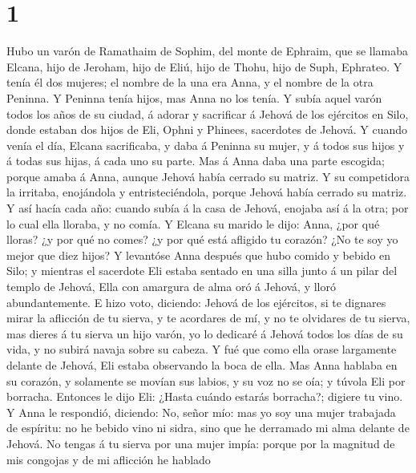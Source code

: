\hypertarget{section}{%
\section{1}\label{section}}

 Hubo un varón de Ramathaim de Sophim, del monte de
Ephraim, que se llamaba Elcana, hijo de Jeroham, hijo de Eliú, hijo de
Thohu, hijo de Suph, Ephrateo.  Y tenía él dos mujeres; el
nombre de la una era Anna, y el nombre de la otra Peninna. Y Peninna
tenía hijos, mas Anna no los tenía.  Y subía aquel varón
todos los años de su ciudad, á adorar y sacrificar á Jehová de los
ejércitos en Silo, donde estaban dos hijos de Eli, Ophni y Phinees,
sacerdotes de Jehová.  Y cuando venía el día, Elcana
sacrificaba, y daba á Peninna su mujer, y á todos sus hijos y á todas
sus hijas, á cada uno su parte.  Mas á Anna daba una parte
escogida; porque amaba á Anna, aunque Jehová había cerrado su matriz.
 Y su competidora la irritaba, enojándola y
entristeciéndola, porque Jehová había cerrado su matriz. 
Y así hacía cada año: cuando subía á la casa de Jehová, enojaba así á la
otra; por lo cual ella lloraba, y no comía.  Y Elcana su
marido le dijo: Anna, ¿por qué lloras? ¿y por qué no comes? ¿y por qué
está afligido tu corazón? ¿No te soy yo mejor que diez hijos?
 Y levantóse Anna después que hubo comido y bebido en
Silo; y mientras el sacerdote Eli estaba sentado en una silla junto á un
pilar del templo de Jehová,  Ella con amargura de alma
oró á Jehová, y lloró abundantemente.  E hizo voto,
diciendo: Jehová de los ejércitos, si te dignares mirar la aflicción de
tu sierva, y te acordares de mí, y no te olvidares de tu sierva, mas
dieres á tu sierva un hijo varón, yo lo dedicaré á Jehová todos los días
de su vida, y no subirá navaja sobre su cabeza.  Y fué
que como ella orase largamente delante de Jehová, Eli estaba observando
la boca de ella.  Mas Anna hablaba en su corazón, y
solamente se movían sus labios, y su voz no se oía; y túvola Eli por
borracha.  Entonces le dijo Eli: ¿Hasta cuándo estarás
borracha?; digiere tu vino.  Y Anna le respondió,
diciendo: No, señor mío: mas yo soy una mujer trabajada de espíritu: no
he bebido vino ni sidra, sino que he derramado mi alma delante de
Jehová.  No tengas á tu sierva por una mujer impía:
porque por la magnitud de mis congojas y de mi aflicción he hablado
